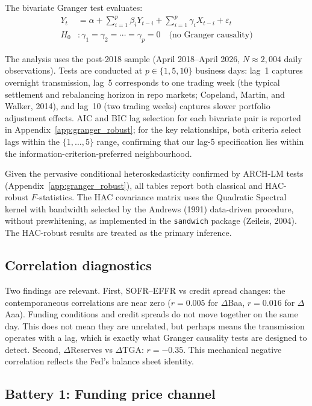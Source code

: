 \documentclass[12pt,a4paper]{article}
\begin{document}
The bivariate Granger test evaluates:
\begin{align}
Y_t &= \alpha + \sum_{i=1}^{p} \beta_i Y_{t-i} + \sum_{i=1}^{p} \gamma_i X_{t-i} + \varepsilon_t \\
H_0&: \gamma_1 = \gamma_2 = \cdots = \gamma_p = 0 \quad \text{(no Granger causality)}
\end{align}

The analysis uses the post-2018 sample (April 2018--April 2026, $N \approx 2{,}004$ daily observations). Tests are conducted at $p \in \{1, 5, 10\}$ business days: lag~1 captures overnight transmission, lag~5 corresponds to one trading week (the typical settlement and rebalancing horizon in repo markets; Copeland, Martin, and Walker, 2014), and lag~10 (two trading weeks) captures slower portfolio adjustment effects. AIC and BIC lag selection for each bivariate pair is reported in Appendix~\ref{app:granger_robust}; for the key relationships, both criteria select lags within the $\{1, \ldots, 5\}$ range, confirming that our lag-5 specification lies within the information-criterion-preferred neighbourhood.

Given the pervasive conditional heteroskedasticity confirmed by ARCH-LM tests (Appendix~\ref{app:granger_robust}), all tables report both classical and HAC-robust $F$-statistics. The HAC covariance matrix uses the Quadratic Spectral kernel with bandwidth selected by the Andrews (1991) data-driven procedure, without prewhitening, as implemented in the \texttt{sandwich} package (Zeileis, 2004). The HAC-robust results are treated as the primary inference.

\subsection{Correlation diagnostics}



Two findings are relevant. First, SOFR--EFFR vs credit spread changes: the contemporaneous correlations are near zero ($r = 0.005$ for $\Delta$Baa, $r = 0.016$ for $\Delta$Aaa). Funding conditions and credit spreads do not move together on the same day. This does not mean they are unrelated, but perhaps means the transmission operates with a lag, which is exactly what Granger causality tests are designed to detect. Second, $\Delta$Reserves vs $\Delta$TGA: $r = -0.35$. This mechanical negative correlation reflects the Fed's balance sheet identity.

\subsection{Battery 1: Funding price channel}
\end{document}
